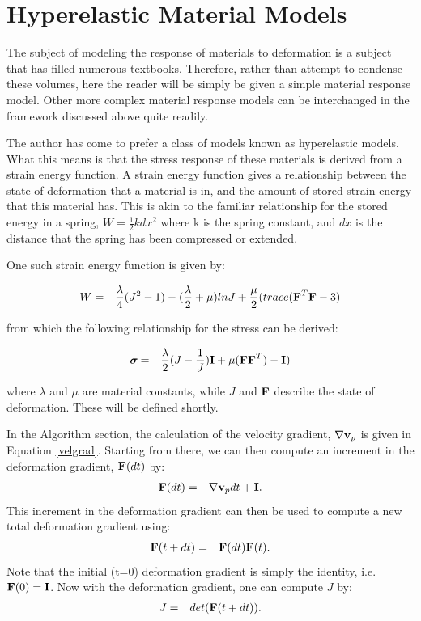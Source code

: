 \documentclass[10pt]{article}
\newcommand{\tn}[1]{\mbox{\bf{#1}}}
\newcommand{\sig}{\mbox{\boldmath $\sigma \!\!$ \unboldmath}}
\begin{document}



\appendix
\section{Hyperelastic Material Models}

The subject of modeling the response of materials to deformation 
is a subject that has filled numerous textbooks.  Therefore, 
rather than attempt to condense these volumes, here the reader 
will be simply be given a simple material response model.  Other 
more complex material response models can be interchanged in the 
framework discussed above quite readily.

The author has come to prefer a class of models known as 
hyperelastic models.  What this means is that the stress 
response of these materials is derived from a strain energy 
function.  A strain energy function gives a relationship between 
the state of deformation that a material is in, and the amount 
of stored strain energy that this material has.  This is akin to 
the familiar relationship for the stored energy in a spring, 
$W=\frac{1}{2} k dx^2$ where k is the spring constant, and $dx$ is
the distance that the spring has been compressed or extended.

One such strain energy function is given by:

\begin{eqnarray}
	W &=& \frac{\lambda}{4}(J^2-1)
 - (\frac{\lambda}{2}+\mu) lnJ
+ \frac{\mu}{2}(trace(\tn{F}^T\tn{F} - 3)
\end{eqnarray}

from which the following relationship for the stress can be 
derived:

\begin{eqnarray}
       \sig &=& \frac{\lambda}{2}(J-\frac{1}{J})\tn{I} 
  + \mu (\tn{F}\tn{F}^T) - \tn{I})
 \label{stress}
\end{eqnarray}

where $\lambda$ and $\mu$ are material constants, while $J$ and 
$\tn{F}$ describe the state of deformation.  These will be 
defined shortly.

In the Algorithm section, the calculation of the velocity 
gradient, $\nabla \tn{v}_p$ is given in Equation \ref{velgrad}.
Starting from there, we can then compute an increment in the 
deformation gradient, $\tn{F}(dt)$ by:
\begin{eqnarray}
	\tn{F}(dt) &=& \nabla \tn{v}_p dt + \tn{I}.
\end{eqnarray}
This increment in the deformation gradient can then be used to 
compute a new total deformation gradient using:
\begin{eqnarray}
	\tn{F}(t+dt) &=& \tn{F}(dt) \tn{F}(t).
\end{eqnarray}
Note that the initial (t=0) deformation gradient is simply the 
identity, i.e. $\tn{F}(0) = \tn{I}$.  Now with the deformation 
gradient, one can compute $J$ by:
\begin{eqnarray}
	J &=& det(\tn{F}(t+dt)).
\end{eqnarray}
\end{document}
